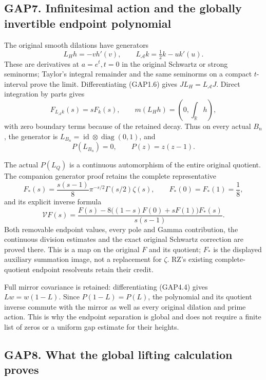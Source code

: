 \subsection{GAP7. Infinitesimal action and the globally invertible
endpoint
polynomial}\label{gap7.-infinitesimal-action-and-the-globally-invertible-endpoint-polynomial}

The original smooth dilations have generators \[
L_Hh=-v h'(v),\qquad L_{\mathcal A}k=\tfrac12k-u k'(u).
\tag{GAP7.1}
\] These are derivatives at \(a=e^t,t=0\) in the original Schwartz or
strong seminorms; Taylor's integral remainder and the same seminorms on
a compact \(t\)-interval prove the limit. Differentiating (GAP1.6) gives
\(JL_H=L_{\mathcal A}J\). Direct integration by parts gives \[
F_{L_{\mathcal A}k}(s)=sF_k(s),\qquad
m(L_Hh)=(0,\int_{\mathbb R}h),
\tag{GAP7.2}
\] with zero boundary terms because of the retained decay. Thus on every
actual \(B_n\), the generator is
\(L_{B_n}=\operatorname{id}\otimes\operatorname{diag}(0,1)\), and \[
P(L_{B_n})=0,\qquad P(z)=z(z-1).
\tag{GAP7.3}
\]

The actual \(P(L_Q)\) is a continuous automorphism of the entire
original quotient. The companion generator proof retains the complete
representative \[
F_*(s)=\frac{s(s-1)}8\pi^{-s/2}\Gamma(s/2)\zeta(s),\qquad
F_*(0)=F_*(1)=\frac18,
\] and its explicit inverse formula \[
\mathcal V F(s)=
\frac{F(s)-8\big((1-s)F(0)+sF(1)\big)F_*(s)}{s(s-1)}.
\tag{GAP7.4}
\] Both removable endpoint values, every pole and Gamma contribution,
the continuous division estimates and the exact original Schwartz
correction are proved there. This is a map on the original \(F\) and its
quotient; \(F_*\) is the displayed auxiliary summation image, not a
replacement for \(\zeta\). RZ's existing complete-quotient endpoint
resolvents retain their credit.

Full mirror covariance is retained: differentiating (GAP4.4) gives
\(Lw=w(1-L)\). Since \(P(1-L)=P(L)\), the polynomial and its quotient
inverse commute with the mirror as well as every original dilation and
prime action. This is why the endpoint separation is global and does not
require a finite list of zeros or a uniform gap estimate for their
heights.

\subsection{GAP8. What the global lifting calculation
proves}\label{gap8.-what-the-global-lifting-calculation-proves}

